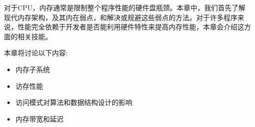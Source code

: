 对于CPU，内存通常是限制整个程序性能的硬件盘瓶颈。本章中，我们首先了解现代内存架构，及其内在弱点，和解决或规避这些弱点的方法。对于许多程序来说，性能完全依赖于开发者是否能利用硬件特性来提高内存性能，本章会介绍这方面的相关技能。

本章将讨论以下内容:

\begin{itemize}
\item 内存子系统
\item 访存性能
\item 访问模式对算法和数据结构设计的影响
\item 内存带宽和延迟
\end{itemize}
























